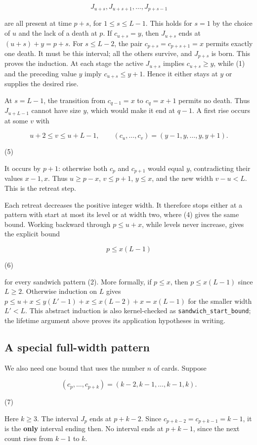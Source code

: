 \documentclass[11pt,a4paper]{article}
\begin{document}
\[
J_{u+s},J_{u+s+1},\ldots,J_{p+s-1}
\]

are all present at time $p+s$, for $1\le s\le L-1$. This holds for $s=1$ by the choice of $u$ and the lack of a death at $p$. If $c_{u+s}=y$, then $J_{u+s}$ ends at $(u+s)+y=p+s$. For $s\le L-2$, the pair $c_{p+s}=c_{p+s+1}=x$ permits exactly one death. It must be this interval; all the others survive, and $J_{p+s}$ is born. This proves the induction. At each stage the active $J_{u+s}$ implies $c_{u+s}\ge y$, while (1) and the preceding value $y$ imply $c_{u+s}\le y+1$. Hence it either stays at $y$ or supplies the desired rise.

At $s=L-1$, the transition from $c_{q-1}=x$ to $c_q=x+1$ permits no death. Thus $J_{u+L-1}$ cannot have size $y$, which would make it end at $q-1$. A first rise occurs at some $v$ with

\[
u+2\le v\le u+L-1,
\qquad(c_u,\ldots,c_v)=(y-1,y,\ldots,y,y+1).
\]

(5)

It occurs by $p+1$: otherwise both $c_p$ and $c_{p+1}$ would equal $y$, contradicting their values $x-1,x$. Thus $u\ge p-x$, $v\le p+1$, $y\le x$, and the new width $v-u<L$. This is the retreat step.

Each retreat decreases the positive integer width. It therefore stops either at a pattern with start at most its level or at width two, where (4) gives the same bound. Working backward through $p\le u+x$, while levels never increase, gives the explicit bound

\[
\boxed{p\le x(L-1)}
\]

(6)

for every sandwich pattern (2). More formally, if $p\le x$, then $p\le x(L-1)$ since $L\ge2$. Otherwise induction on $L$ gives $p\le u+x\le y(L'-1)+x\le x(L-2)+x=x(L-1)$ for the smaller width $L'<L$. This abstract induction is also kernel-checked as \texttt{sandwich\_start\_bound}; the lifetime argument above proves its application hypotheses in writing.

\subsection{A special full-width pattern}

We also need one bound that uses the number $n$ of cards. Suppose

\[
(c_p,\ldots,c_{p+k})=(k-2,k-1,\ldots,k-1,k).
\]

(7)

Here $k\ge3$. The interval $J_p$ ends at $p+k-2$. Since $c_{p+k-2}=c_{p+k-1}=k-1$, it is the \textbf{only} interval ending then. No interval ends at $p+k-1$, since the next count rises from $k-1$ to $k$.
\end{document}
